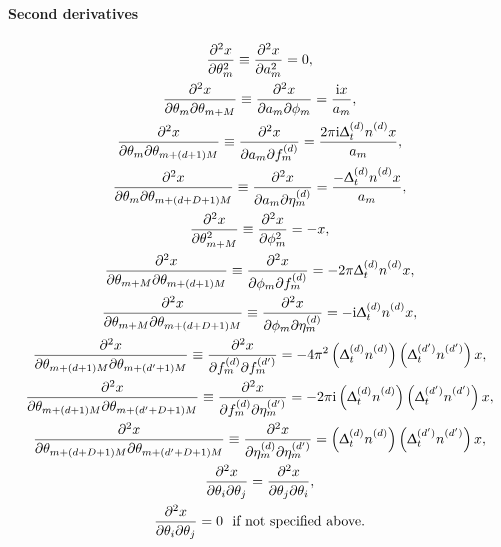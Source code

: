 \paragraph{Second derivatives}
\begin{subequations}
    \begin{gather}
        \xderivtwosame{\theta_{m}} \equiv
            \xderivtwosame{a_m} =
            0,
            \label{eq:amp-second-deriv}\\
        \xderivtwodiff{\theta_{m}}{\theta_{m + M}} \equiv
            \xderivtwodiff{a_m}{\phi_m} =
            \frac{\iu x}{a_m},\\
        \xderivtwodiff{\theta_{m}}{\theta_{m + (d + 1)M}} \equiv
            \xderivtwodiff{a_m^{\vphantom{(d)}}}{\fdm} =
            \frac{2 \pi \iu \Dtd \nd x}{a_m},\\
        \xderivtwodiff{\theta_{m}}{\theta_{m + (d + D + 1)M}} \equiv
            \xderivtwodiff{a_m^{\vphantom{(d)}}}{\etadm} =
            \frac{-\Dtd \nd x}{a_m},\\
        \xderivtwosame{\theta_{m + M}} \equiv
            \xderivtwosame{\phi_m} =
            -x,\\
        \xderivtwodiff{\theta_{m + M}}{\theta_{m + (d + 1)M}} \equiv
            \xderivtwodiff{\phi_m^{\vphantom{(d)}}}{\fdm} =
            -2 \pi \Dtd \nd x,\\
        \xderivtwodiff{\theta_{m + M}}{\theta_{m + (d + D + 1)M}} \equiv
            \xderivtwodiff{\phi_m^{\vphantom{(d)}}}{\etadm} =
            -\iu \Dtd \nd x,\\
        \xderivtwodiff{\theta_{m + (d + 1)M}}{\theta_{m + (d^{\prime} + 1)M}} \equiv
            \xderivtwodiff{\fdm}{\fdmp} =
            -4\pi^2 \left(\Dtd \nd \right) \left(\Dtdp \ndp \right) x,\\
        \xderivtwodiff{\theta_{m + (d + 1)M}}{\theta_{m + (d^{\prime} + D + 1)M}} \equiv
            \xderivtwodiff{\fdm}{\etadmp} =
            -2 \pi \iu \left(\Dtd \nd \right) \left(\Dtdp \ndp \right) x,\\
        \xderivtwodiff{\theta_{m + (d + D + 1)M}}{\theta_{m + (d^{\prime} + D + 1)M}} \equiv
            \xderivtwodiff{\etadm}{\etadmp} =
            \left(\Dtd \nd \right) \left(\Dtdp \ndp \right) x,\\
        \xderivtwodiff{\theta_{i}}{\theta_{j}} =
            \xderivtwodiff{\theta_{j}}{\theta_{i}},
            \label{eq:symmetric-second-derivs}\\
        \xderivtwodiff{\theta_{i}}{\theta_{j}} = 0\ \text{ if not specified above.}
        \label{eq:zero-second-deriv}
    \end{gather}
    \label{eq:second-derivs}
\end{subequations}

